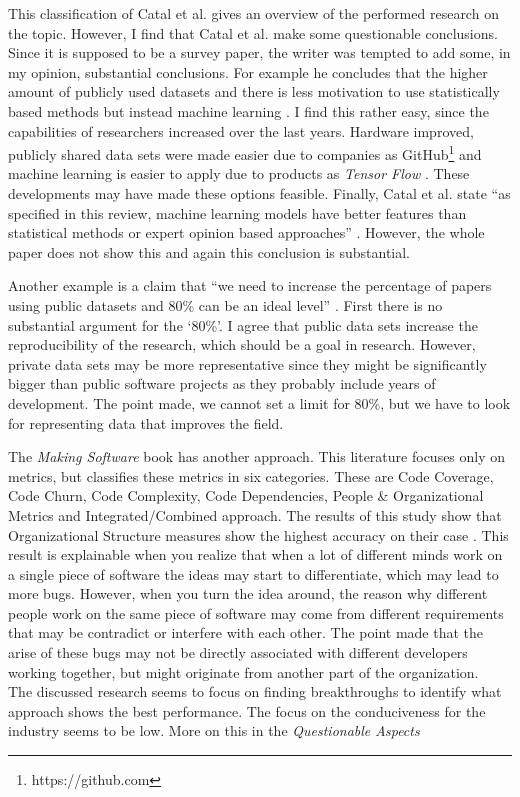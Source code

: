 This classification of Catal et al. gives an overview of the performed research on the topic.
However, I find that Catal et al. make some questionable conclusions.
Since it is supposed to be a survey paper, the writer was tempted to add some, in my opinion, substantial conclusions.
For example he concludes that the higher amount of publicly used datasets \autocite[7349]{Catal20097346}
and there is less motivation to use statistically based methods but instead machine learning \autocite[7350]{Catal20097346}.
I find this rather easy, since the capabilities of researchers increased over the last years.
Hardware improved, publicly shared data sets were made easier due to companies as GitHub\footnote{https://github.com}
and machine learning is easier to apply due to products as \textit{Tensor Flow} \autocite{abaditensorflow}.
These developments may have made these options feasible.
Finally, Catal et al. state ``as specified in this review, machine learning models have better features than statistical methods or expert opinion based approaches'' \autocite[7351]{Catal20097346}.
However, the whole paper does not show this and again this conclusion is substantial.

Another example is a claim that ``we need to increase the percentage of papers using public datasets and 80\% can be an ideal level'' \autocite[7351]{Catal20097346}.
First there is no substantial argument for the `80\%'. I agree that public data sets increase the reproducibility of the research, which should be a goal in research.
However, private data sets may be more representative since they might be significantly bigger than public software projects as they probably include years of development.
The point made, we cannot set a limit for 80\%, but we have to look for representing data that improves the field.

The \textit{Making Software} \autocite{MAKING_SOFTWARE} book has another approach. This literature focuses only on metrics, but classifies these metrics in six categories.
These are Code Coverage, Code Churn, Code Complexity, Code Dependencies, People \& Organizational Metrics and Integrated/Combined approach.
The results of this study show that Organizational Structure measures show the highest accuracy on their case \autocite[430]{MAKING_SOFTWARE}.
This result is explainable when you realize that when a lot of different minds work on a single piece of software the ideas may start to differentiate, which may lead to more bugs.
However, when you turn the idea around, the reason why different people work on the same piece of software may come from different requirements that may be contradict or interfere with each other.
The point made that the arise of these bugs may not be directly associated with different developers working together, but might originate from another part of the organization.
\\
The discussed research seems to focus on finding breakthroughs to identify what approach shows the best performance.
The focus on the conduciveness for the industry seems to be low. More on this in the \textit{Questionable Aspects}

